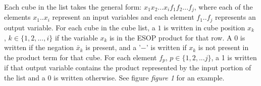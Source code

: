 Each cube in the list takes the general form: $x_{1} x_{2} ... x_{i} f_{1} f_{2} ... f_{j}$, where each of the elements $x_{1} .. x_{i}$ 
represent an input variables and each element $f_{1} .. f_{j}$ represents an output variable. For each cube in the 
cube list, a $1$ is written in cube position $x_{k}$ , $k \in \{1,2, ..., i\}$ if the variable $x_{k}$ is in 
the ESOP product for that row. A $0$ is written if the negation $\bar{x}_{k}$ is present, and a '$-$' is written if $x_{k}$ is not present in the
product term for that cube. For each element $f_{p}$, $p \in \{1,2,...j\}$, a 1 is written if that output variable contains 
the product represented by the input portion of the list and a 0 is written otherwise. See figure \emph{figure 1} for 
an example. \\
